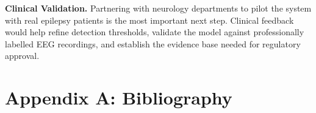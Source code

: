\documentclass[12pt, a4paper, oneside]{report}
\begin{document}
\textbf{Clinical Validation.}
Partnering with neurology departments to pilot the system with real epilepsy patients is the most important next step. Clinical feedback would help refine detection thresholds, validate the model against professionally labelled EEG recordings, and establish the evidence base needed for regulatory approval.



\appendix

\chapter*{Appendix A: Bibliography}
\end{document}
